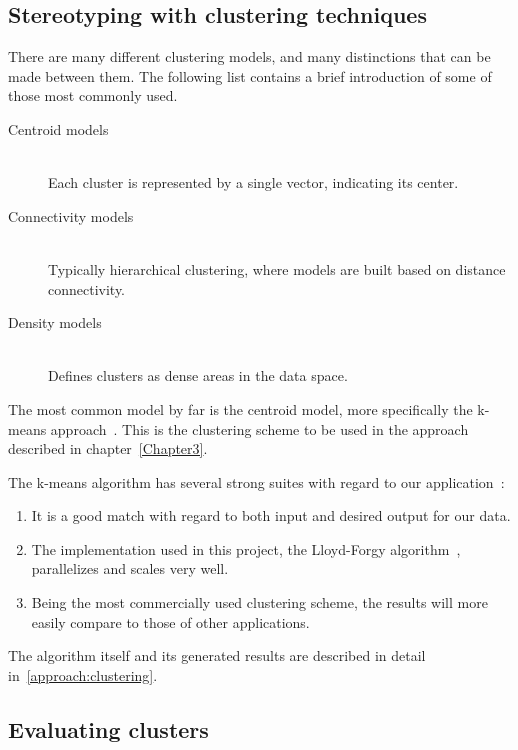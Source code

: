   \subsection{Stereotyping with clustering techniques}
  \label{survey:clustering_intro}

    There are many different clustering models, and many distinctions that can be made between them. The following list contains a brief introduction of some of those most commonly used.

    \begin{description}
      \item[Centroid models] \hfill \\
        Each cluster is represented by a single vector, indicating its center.
      \item[Connectivity models] \hfill \\
        Typically hierarchical clustering, where models are built based on distance connectivity.
      \item[Density models] \hfill \\
        Defines clusters as dense areas in the data space.
    \end{description}

    The most common model by far is the centroid model, more specifically the k-means approach~\cite{Berkhin2006}. This is the clustering scheme to be used in the approach described in chapter~\ref{Chapter3}.

    The k-means algorithm has several strong suites with regard to our application~\cite{Berkhin2006}:

    \begin{enumerate}
      \item It is a good match with regard to both input and desired output for our data.
      \item The implementation used in this project, the Lloyd-Forgy algorithm~\cite{Forgy1965}, parallelizes and scales very well.
      \item Being the most commercially used clustering scheme, the results will more easily compare to those of other applications.
    \end{enumerate}

    The algorithm itself and its generated results are described in detail in~\ref{approach:clustering}.

  \subsection{Evaluating clusters}
  \label{survey:evaluating_clusters}

